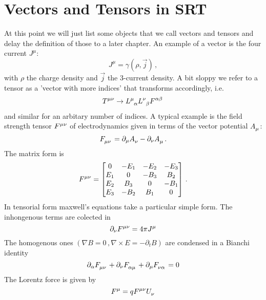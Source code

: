 \section{Vectors and Tensors in SRT} 
At this point we will just list some objects that we call vectors and tensors
and delay the definition of those to a later chapter.
An example of a vector is the four current $J^\mu$:
\begin{equation}
J^\mu=\gamma(\rho,\vec{j})\, ,
\end{equation}
with $\rho$ the charge density and $\vec{j}$ the 3-current density. A bit sloppy
we refer to a tensor as a 'vector with more indices' that transforms
accordingly, i.e.
\begin{equation}
\tensor{T}{^\mu^\nu}\to
\tensor{L}{^\mu_\alpha}\tensor{L}{^\nu_\beta}\tensor{F}{^\alpha^\beta}\, 
\end{equation}
and similar for an arbitary number of indices. A typical example is the field
strength tensor $\tensor{F}{^\mu^\nu}$ of electrodynamics given in terms of the
vector potential $\tensor{A}{_\mu}$:
\begin{equation}
\tensor{F}{_\mu_\nu}=\partial_\mu\tensor{A}{_\nu}-\partial_\nu\tensor{A}{_\mu}\,
.
\end{equation}
The matrix form is 
\begin{equation}
\tensor{F}{^\mu^\nu}=
\begin{bmatrix}
                  0  &   -E_1 &  -E_2 &  -E_3 \\
                 E_1 &   0  &  -B_3 & B_2 \\
                 E_2 & B_3 &   0  &  -B_1 \\
                 E_3 &  -B_2 & B_1 &   0  \\
\end{bmatrix}\, .
\end{equation}
In tensorial form maxwell's equations take a particular simple form. The
inhongenous terms are colected in 
\begin{equation}
\partial_\nu\tensor{F}{^\mu^\nu}=4\pi\tensor{J}{^\mu}
\end{equation}
The homogenous ones $(\nabla B=0\, ,\nabla\times E=-\partial_t
B)$ are condensed in a Bianchi identity
\begin{equation}
\partial_\alpha\tensor{F}{_\mu_\nu}
+\partial_\nu\tensor{F}{_\alpha_\mu}
+\partial_\mu\tensor{F}{_\nu_\alpha}=0
\end{equation}
The Lorentz force is given by
\begin{equation}
\tensor{F}{^\mu}=q\tensor{F}{^\mu^\nu}\tensor{U}{_\nu}
\end{equation} 
